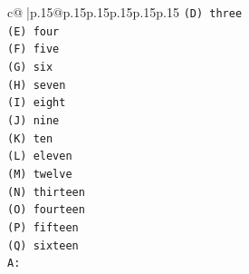 \documentclass{article}
\begin{document}
{\begin{supertabular}{c@{$\;$}|p{.15\linewidth}@{}p{.15\linewidth}p{.15\linewidth}p{.15\linewidth}p{.15\linewidth}p{.15\linewidth}}
{{{\texttt{(D) three} \\
\texttt{(E) four} \\
\texttt{(F) five} \\
\texttt{(G) six} \\
\texttt{(H) seven} \\
\texttt{(I) eight} \\
\texttt{(J) nine} \\
\texttt{(K) ten} \\
\texttt{(L) eleven} \\
\texttt{(M) twelve} \\
\texttt{(N) thirteen} \\
\texttt{(O) fourteen} \\
\texttt{(P) fifteen} \\
\texttt{(Q) sixteen} \\
\texttt{A:} \\
            }
        }
    }
     \\ \\


\end{supertabular}}
\end{document}
